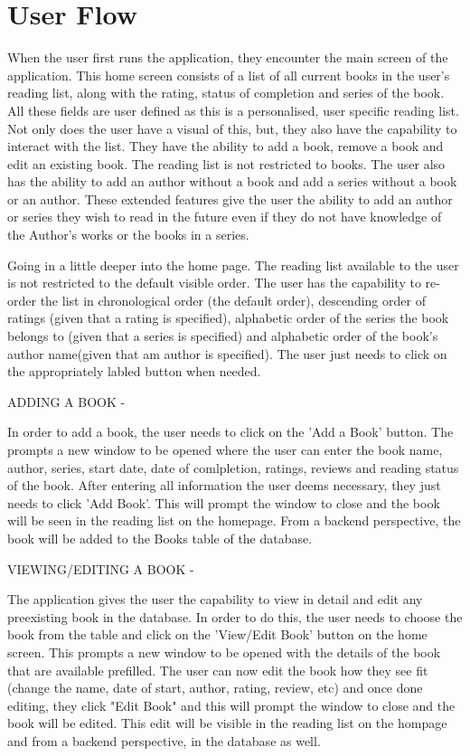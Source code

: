 \documentclass{article}
\begin{document}
\section*{User Flow}

When the user first runs the application, they encounter the main screen of the application. 
This home screen consists of a list of all current books in the user's reading list, along 
with the rating, status of completion and series of the book. All these fields are user defined 
as this is a personalised, user specific reading list. Not only does the user have a visual of this, 
but, they also have the capability to interact with the list. They have the ability to add a book, 
remove a book and edit an existing book. The reading list is not restricted to books. The user 
also has the ability to add an author without a book and add a series without a book or an author. 
These extended features give the user the ability to add an author or series they wish to read in 
the future even if they do not have knowledge of the Author's works or the books in a series.

Going in a little deeper into the home page. The reading list available to the user is not 
restricted to the default visible order. The user has the capability to re-order the list in 
chronological order (the default order), descending order of ratings (given that a rating is specified), 
alphabetic order of the series the book belongs to (given that a series is specified) and alphabetic 
order of the book's author name(given that am author is specified). The user just needs to click on 
the appropriately labled button when needed.

ADDING A BOOK - 

In order to add a book, the user needs to click on the 'Add a Book' button. The prompts a new window to 
be opened where the user can enter the book name, author, series, start date, date of comlpletion, 
ratings, reviews and reading status of the book. After entering all information the user deems necessary, 
they just needs to click 'Add Book'. This will prompt the window to close and the book will be seen in 
the reading list on the homepage. From a backend perspective, the book will be added to the Books table 
of the database.

VIEWING/EDITING A BOOK - 

The application gives the user the capability to view in detail and edit any preexisting book in the 
database. In order to do this, the user needs to choose the book from the table and click on the 
'View/Edit Book' button on the home screen. This prompts a new window to be opened with the details 
of the book that are available prefilled. The user can now edit the book how they see fit (change the 
name, date of start, author, rating, review, etc) and once done editing, they click "Edit Book" and this 
will prompt the window to close and the book will be edited. This edit will be visible in the reading list 
on the hompage and from a backend perspective, in the database as well.
\end{document}

